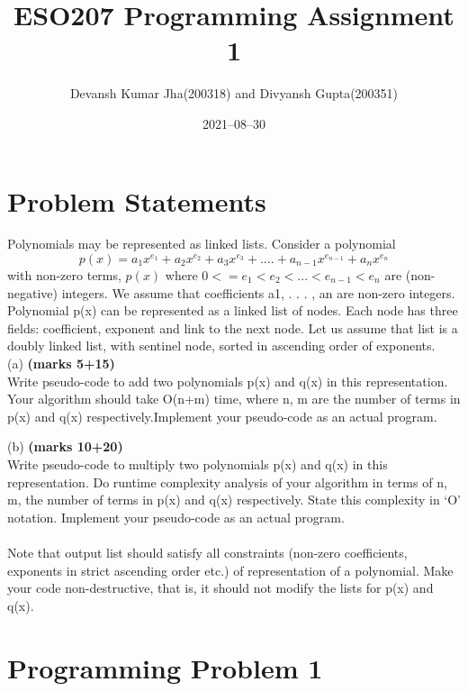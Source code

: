 \documentclass[20pt]{article}
\title{ESO207 Programming Assignment 1}
\author{Devansh Kumar Jha(200318) and Divyansh Gupta(200351)}
\date{2021–08–30}
\begin{document}
\maketitle

\section{Problem Statements}

Polynomials may be represented as linked lists.  Consider a polynomial 
\begin{equation*}
p(x) = a_1x^{e_1} + a_2x^{e_2} + a_3x^{e_3} + . . . . + a_{n-1}x^{e_{n-1}} + a_nx^{e_n}
\end{equation*}
with non-zero terms, $ p(x) $ 
where $ 0 <= e_1< e_2< . . . < e_{n-1} < e_n $ are (non-negative) integers.  We assume that coefficients  {a1, . . . , an} are non-zero integers. Polynomial {p(x)} can be represented as a linked list of nodes.  Each node has three fields:  coefficient, exponent and link to the next node.  Let us assume that list is a doubly linked list, with sentinel node, sorted in ascending order of exponents.
\\

(a) \textbf{(marks 5+15)} \\ 
Write pseudo-code to add two polynomials {p(x) and q(x)} in this representation.  Your algorithm should take {O(n+m)} time, where {n, m} are the number of terms in {p(x) and q(x)} respectively.Implement your pseudo-code as an actual program.

(b) \textbf{(marks 10+20)} \\
Write  pseudo-code  to  multiply  two  polynomials {p(x)  and q(x)}  in  this representation.   Do  runtime  complexity  analysis  of  your  algorithm  in  terms  of {n, m},  the number of terms in {p(x) and q(x)} respectively.  State this complexity in ‘O’ notation. Implement your pseudo-code as an actual program.
\\ \\
Note  that  output  list  should  satisfy  all  constraints  (non-zero  coefficients,  exponents  in  strict ascending order etc.)  of representation of a polynomial.  Make your code non-destructive, that is, it should not modify the lists for {p(x) and q(x)}.

\newpage
\section{Programming Problem 1}
\end{document}
